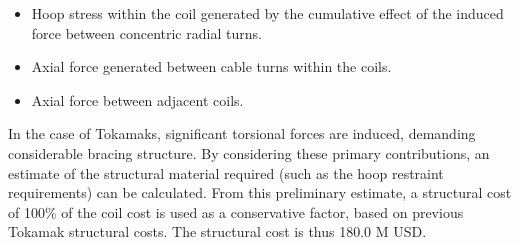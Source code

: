 \begin{itemize}
    \item Hoop stress within the coil generated by the cumulative effect of the induced force between concentric radial turns.
    \item Axial force generated between cable turns within the coils. 
    \item Axial force between adjacent coils.
\end{itemize}


In the case of Tokamaks, significant torsional forces are induced, demanding considerable bracing structure. By considering these primary contributions, an estimate of the structural material required (such as the hoop restraint requirements) can be calculated. From this preliminary estimate, a structural cost of 100\% of the coil cost is used as a conservative factor, based on previous Tokamak structural costs. The structural cost is thus 180.0 M USD.


